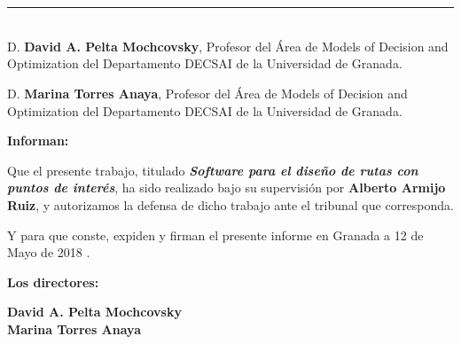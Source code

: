 \chapter*{}
\thispagestyle{empty}

\noindent\rule[-1ex]{\textwidth}{2pt}\\[4.5ex]

D. \textbf{David A. Pelta Mochcovsky}, Profesor del Área de Models of Decision and Optimization del Departamento DECSAI de la Universidad de Granada.\newline

D. \textbf{Marina Torres Anaya}, Profesor del Área de Models of Decision and Optimization del Departamento DECSAI de la Universidad de Granada.

\vspace{0.5cm}

\textbf{Informan:}

\vspace{0.5cm}

Que el presente trabajo, titulado \textit{\textbf{Software para el diseño de rutas con puntos de interés}},
ha sido realizado bajo su supervisión por \textbf{Alberto Armijo Ruiz}, y autorizamos la defensa de dicho trabajo ante el tribunal
que corresponda.

\vspace{0.5cm}

Y para que conste, expiden y firman el presente informe en Granada a 12 de Mayo de 2018 .

\vspace{1cm}

\textbf{Los directores:}

\vspace{5cm}

\noindent \textbf{David A. Pelta Mochcovsky} \\
\noindent \textbf{Marina Torres Anaya}


